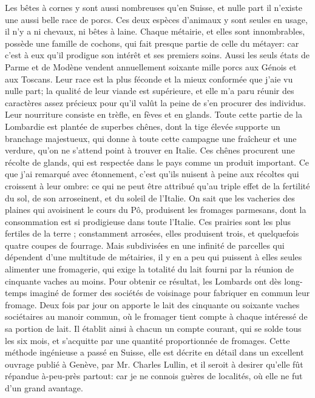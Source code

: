 Les bêtes à cornes y sont aussi nombreuses qu'en Suisse, et nulle part il n'existe une aussi belle race de porcs. Ces deux espèces d'animaux y sont seules en usage, il n'y a ni chevaux,\setcounter{page}{436} ni bêtes à laine. Chaque métairie, et elles sont innombrables, possède une famille de cochons, qui fait presque partie de celle du métayer: car c'est à eux qu'il prodigue son intérêt et ses premiers soins. Aussi les seuls états de Parme et de Modène vendent annuellement soixante mille porcs aux Génois et aux Toscans. Leur race est la plus féconde et la mieux conformée que j'aie vu nulle part; la qualité de leur viande est supérieure, et elle m'a paru réunir des caractères assez précieux pour qu'il valût la peine de s'en procurer des individus. Leur nourriture consiste en trèfle, en fèves et en glands. Toute cette partie de la Lombardie est plantée de superbes chênes, dont la tige élevée supporte un branchage majestueux, qui donne à toute cette campagne une fraîcheur et une verdure, qu'on ne s'attend point à trouver en Italie. Ces chênes procurent une récolte de glands, qui est respectée dans le pays comme un produit important. Ce que j'ai remarqué avec étonnement, c'est qu'ils nuisent à peine aux récoltes qui croissent à leur ombre: ce qui ne peut être attribué qu'au triple effet de la fertilité du sol, de son arroseinent, et du soleil de l'Italie.\setcounter{page}{437} On sait que les vacheries des plaines qui avoisinent le cours du Pô, produisent les fromages parmesans, dont la consommation est si prodigieuse dans toute l'Italie. Ces prairies sont les plus fertiles de la terre ; constamment arrosées, elles produisent trois, et quelquefois quatre coupes de fourrage. Mais subdivisées en une infinité de parcelles qui dépendent d'une multitude de métairies, il y en a peu qui puissent à elles seules alimenter une fromagerie, qui exige la totalité du lait fourni par la réunion de cinquante vaches au moins. Pour obtenir ce résultat, les Lombards ont dès long-temps imaginé de former des sociétés de voisinage pour fabriquer en commun leur fromage. Deux fois par jour on apporte le lait des cinquante ou soixante vaches sociétaires au manoir commun, où le fromager tient compte à chaque intéressé de sa portion de lait. Il établit ainsi à chacun un compte courant, qui se solde tous les six mois, et s'acquitte par une quantité proportionnée de fromages. Cette méthode ingénieuse a passé en Suisse, elle est décrite en détail dans un excellent ouvrage publié à Genève, par Mr. Charles Lullin, et il seroit à desirer qu'elle fût répandue à-peu-près partout: car je ne connois\setcounter{page}{438} guères de localités, où elle ne fut d'un grand avantage.
